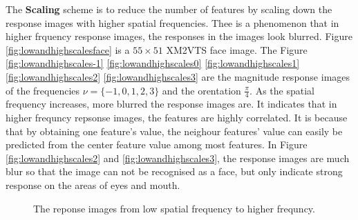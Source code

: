 The \textbf{Scaling} scheme is to reduce the number of features by scaling down the response images with higher spatial frequencies. Thee is a phenomenon that in higher frquency response images, the responses in the images look blurred. \mbox{Figure} \ref{fig:lowandhighscalesface} is a $55\times51$ \mbox{XM2VTS} face image. The \mbox{Figure} \ref{fig:lowandhighscales-1}  \ref{fig:lowandhighscales0}  \ref{fig:lowandhighscales1}  \ref{fig:lowandhighscales2} \ref{fig:lowandhighscales3} are the magnitude response images of the frequencies $\nu=\{-1,0,1,2,3\}$ and the orentation $\frac{\pi}{4}$. As the spatial frequency increases, more blurred the response images are. It indicates that in higher frequncy repsonse images, the features are highly correlated. It is because that by obtaining one feature's value, the neighour features' value can easily be predicted from the center feature value among most features. In \mbox{Figure} \ref{fig:lowandhighscales2} and \ref{fig:lowandhighscales3}, the response images are much blur so that the image can not be recognised as a face, but only indicate strong response on the areas of eyes and mouth.
\begin{figure}
\begin{center}
 \caption{The reponse images from low spatial frequency to higher frequncy.}
\label{fig:lowandhighscales}
\end{center}
\end{figure}
